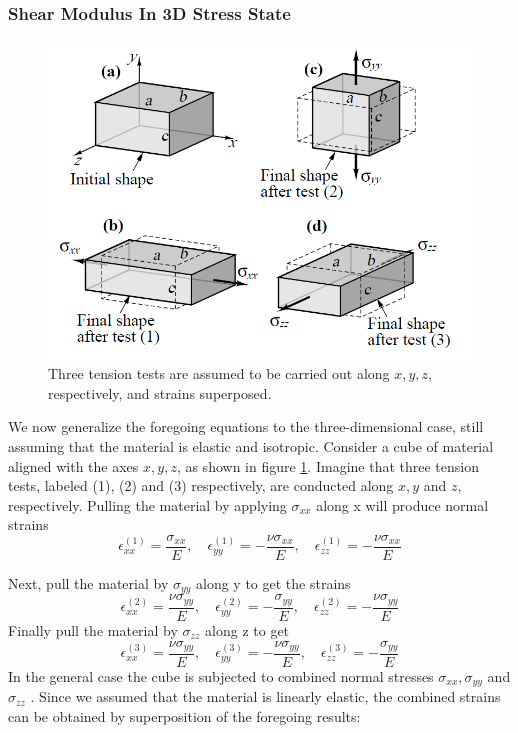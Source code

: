 \subsubsection{Shear Modulus In 3D Stress State}

\begin{figure}[h]
\centering
\includegraphics[scale=0.4]{../images/hookes.png}
\caption{Three tension tests are assumed to be carried out along $x, y, z$, respectively, and strains superposed.}
\label{fig:hookes}
\end{figure}


We now generalize the foregoing equations to the three-dimensional case, still assuming that the
material is elastic and isotropic. Consider a cube of material aligned with the axes ${x, y, z}$, as
shown in figure \ref{fig:hookes}. Imagine that three tension tests, labeled (1), (2) and (3) respectively, are
conducted along $x, y$ and $z$, respectively. Pulling the material by applying $\sigma_{xx}$ along x will produce
normal strains
\begin{equation}
\epsilon_{xx}^{(1)} = \frac{\sigma_{xx}}{E}, \quad
\epsilon_{yy}^{(1)} = -\frac{\nu\sigma_{xx}}{E}, \quad
\epsilon_{zz}^{(1)} = -\frac{\nu\sigma_{xx}}{E}
\end{equation}

Next, pull the material by $\sigma_{yy}$ along y to get the strains
\begin{equation}
\epsilon_{xx}^{(2)} = \frac{\nu\sigma_{yy}}{E}, \quad
\epsilon_{yy}^{(2)} = -\frac{\sigma_{yy}}{E}, \quad
\epsilon_{zz}^{(2)} = -\frac{\nu\sigma_{yy}}{E}
\end{equation}
Finally pull the material by $\sigma_{zz}$ along z to get
\begin{equation}
\epsilon_{xx}^{(3)} = \frac{\nu\sigma_{yy}}{E}, \quad
\epsilon_{yy}^{(3)} = -\frac{\nu\sigma_{yy}}{E}, \quad
\epsilon_{zz}^{(3)} = -\frac{\sigma_{yy}}{E}
\end{equation}
In the general case the cube is subjected to combined normal stresses $\sigma_{xx} ,\sigma_{yy}$ and $\sigma_{zz}$ . Since we assumed that the material is linearly elastic, the combined strains can be obtained by superposition of the foregoing results:

